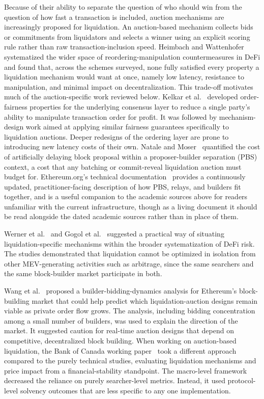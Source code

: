 \documentclass[conference]{IEEEtran}
\begin{document}
Because of their ability to separate the question of who should win from
the question of how fast a transaction is included, auction mechanisms
are increasingly proposed for liquidation. An auction-based mechanism
collects bids or commitments from liquidators and selects a winner using
an explicit scoring rule rather than raw transaction-inclusion speed.
Heimbach and Wattenhofer~\cite{heimbach2022sok} systematized the wider
space of reordering-manipulation countermeasures in DeFi and found that,
across the schemes surveyed, none fully satisfied every property a
liquidation mechanism would want at once, namely low latency, resistance
to manipulation, and minimal impact on decentralization. This trade-off
motivates much of the auction-specific work reviewed below.
Kelkar et al.~\cite{kelkar2020order} developed order-fairness properties
for the underlying consensus layer to reduce a single party's ability to
manipulate transaction order for profit. It was followed by
mechanism-design work aimed at applying similar fairness guarantees
specifically to liquidation auctions. Deeper redesigns of the ordering
layer are prone to introducing new latency costs of their own.
Natale and Moser~\cite{natale2023cost} quantified the cost of
artificially delaying block proposal within a proposer-builder separation
(PBS) context, a cost that any batching or commit-reveal liquidation
auction must budget for. Ethereum.org's technical
documentation~\cite{ethereumorg} provides a continuously updated,
practitioner-facing description of how PBS, relays, and builders fit
together, and is a useful companion to the academic sources above for
readers unfamiliar with the current infrastructure, though as a living
document it should be read alongside the dated academic sources rather
than in place of them.

Werner et al.~\cite{werner2021sok} and Gogol et al.~\cite{gogol2024sok}
suggested a practical way of situating liquidation-specific mechanisms
within the broader systematization of DeFi risk. The studies
demonstrated that liquidation cannot be optimized in isolation from
other MEV-generating activities such as arbitrage, since the same
searchers and the same block-builder market participate in both.

Wang et al.~\cite{wang2024private} proposed a builder-bidding-dynamics
analysis for Ethereum's block-building market that could help predict
which liquidation-auction designs remain viable as private order flow
grows. The analysis, including bidding concentration among a small
number of builders, was used to explain the direction of the market. It
suggested caution for real-time auction designs that depend on
competitive, decentralized block building. When working on
auction-based liquidation, the Bank of Canada working
paper~\cite{bankofcanada2025} took a different approach compared to the
purely technical studies, evaluating liquidation mechanisms and price
impact from a financial-stability standpoint. The macro-level framework
decreased the reliance on purely searcher-level metrics. Instead, it
used protocol-level solvency outcomes that are less specific to any one
implementation.
\end{document}
